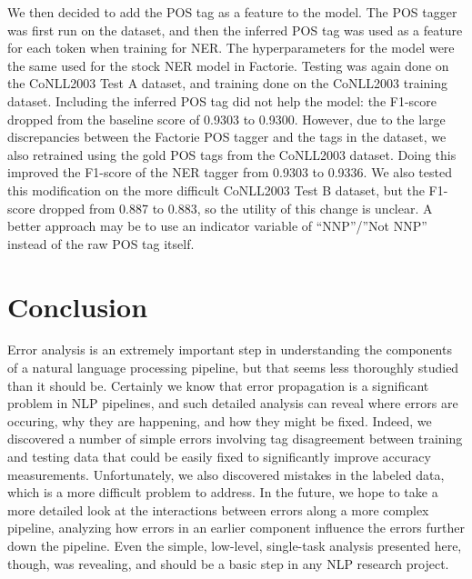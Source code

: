 \documentclass[12pt]{article}
\begin{document}
We then decided to add the POS tag as a feature to the model. The POS tagger was first run on the dataset, and then the inferred POS tag was used as a feature for each token when training for NER. The hyperparameters for the model were the same used for the stock NER model in Factorie. Testing was again done on the CoNLL2003 Test A dataset, and training done on the CoNLL2003 training dataset. Including the inferred POS tag did not help the model: the F1-score dropped from the baseline score of 0.9303 to 0.9300. However, due to the large discrepancies between the Factorie POS tagger and the tags in the dataset, we also retrained using the gold POS tags from the CoNLL2003 dataset. Doing this improved the F1-score of the NER tagger from 0.9303 to 0.9336. We also tested this modification on the more difficult CoNLL2003 Test B dataset, but the F1-score dropped from 0.887 to 0.883, so the utility of this change is unclear. A better approach may be to use an indicator variable of “NNP”/”Not NNP” instead of the raw POS tag itself.

\section{Conclusion}
Error analysis is an extremely important step in understanding the components of a natural language processing pipeline, but that seems less thoroughly studied than it should be. Certainly we know that error propagation is a significant problem in NLP pipelines, and such detailed analysis can reveal where errors are occuring, why they are happening, and how they might be fixed. Indeed, we discovered a number of simple errors involving tag disagreement between training and testing data that could be easily fixed to significantly improve accuracy measurements. Unfortunately, we also discovered mistakes in the labeled data, which is a more difficult problem to address. In the future, we hope to take a more detailed look at the interactions between errors along a more complex pipeline, analyzing how errors in an earlier component influence the errors further down the pipeline. Even the simple, low-level, single-task analysis presented here, though, was revealing, and should be a basic step in any NLP research project.




\end{document}
